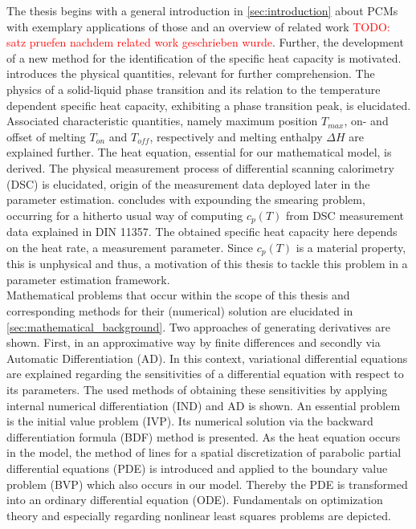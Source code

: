 \documentclass{scrartcl}[12pt, halfparskip]
\numberwithin{equation}{section}
\numberwithin{figure}{section}
\numberwithin{table}{section}
\newcommand{\todo}[1]{\textcolor{red}{TODO: #1}}
\begin{document}
The thesis begins with a general introduction in \cref{sec:introduction} about PCMs with exemplary applications of those and an overview of related work \todo{satz pruefen nachdem related work geschrieben wurde}. 
Further, the development of a new method for the identification of the specific heat capacity is motivated.
 introduces the physical quantities, relevant for further comprehension. 
The physics of a solid-liquid phase transition and its relation to the temperature dependent specific heat capacity, exhibiting a phase transition peak, is elucidated.
Associated characteristic quantities, namely maximum position $T_{max}$, on- and offset of melting $T_{on}$ and $T_{off}$, respectively and melting enthalpy $\Delta H$ are explained further. 
The heat equation, essential for our mathematical model, is derived. 
The physical measurement process of differential scanning calorimetry (DSC) is elucidated, origin of the measurement data deployed later in the parameter estimation. 
 concludes with expounding the smearing problem, occurring for a hitherto usual way of computing $c_p(T)$ from DSC measurement data explained in DIN 11357. 
The obtained specific heat capacity here depends on the heat rate, a measurement parameter. 
Since $c_p(T)$ is a material property, this is unphysical and thus, a motivation of this thesis to tackle this problem in a parameter estimation framework. \\ 
Mathematical problems that occur within the scope of this thesis and corresponding methods for their (numerical) solution are elucidated in \cref{sec:mathematical_background}. 
Two approaches of generating derivatives are shown. 
First, in an approximative way by finite differences and secondly via Automatic Differentiation (AD). 
In this context, variational differential equations are explained regarding the sensitivities of a differential equation with respect to its parameters. 
The used methods of obtaining these sensitivities by applying internal numerical differentiation (IND) and AD is shown. 
An essential problem is the initial value problem (IVP). 
Its numerical solution via the backward differentiation formula (BDF) method is presented. 
As the heat equation occurs in the model, the method of lines for a spatial discretization of parabolic partial differential equations (PDE) is introduced and applied to the boundary value problem (BVP) which also occurs in our model. 
Thereby the PDE is transformed into an ordinary differential equation (ODE).
Fundamentals on optimization theory and especially regarding nonlinear least squares problems are depicted. 
\end{document}
